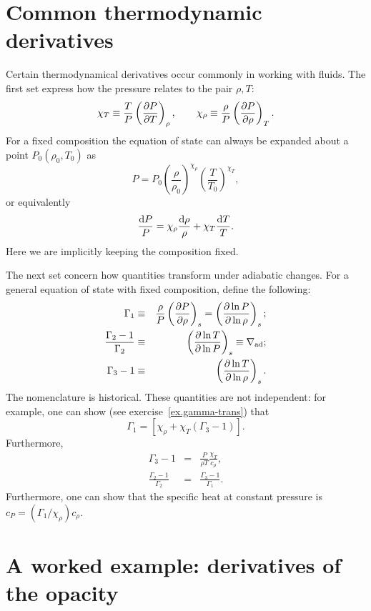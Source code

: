 \section{Common thermodynamic derivatives}

Certain thermodynamical derivatives occur commonly in working with fluids. The first set express how the pressure relates to the pair $\rho,T$:
\begin{equation}
\chi_{T}\equiv\frac{T}{P}\left(\frac{\partial P}{\partial T}\right)_{\rho},\qquad\chi_{\rho}\equiv\frac{\rho}{P}\left(\frac{\partial P}{\partial \rho}\right)_{T}.
\end{equation}
For a fixed composition the equation of state can always be expanded about a point $P_{0}(\rho_{0},T_{0})$ as
\begin{equation}\label{e.eos}
P = P_{0}\left(\frac{\rho}{\rho_{0}}\right)^{\chi_{\rho}}\left(\frac{T}{T_{0}}\right)^{\chi_{T}},
\end{equation}
or equivalently
\[
\frac{\mathrm{d} P}{P} = \chi_{\rho}\frac{\mathrm{d} \rho}{\rho} + \chi_{T}\frac{\mathrm{d} T}{T}.
\]
Here we are implicitly keeping the composition fixed.

The next set concern how quantities transform under adiabatic changes.  For a general equation of state with fixed composition, define the following:
\begin{eqnarray}
\Gamma_{1} &\equiv& \frac{\rho}{P}\left(\frac{\partial P}{\partial \rho}\right)_{s} = \left(\frac{\partial \ln P}{\partial \ln\rho}\right)_{s};\\
\frac{\Gamma_{2}-1}{\Gamma_{2}} &\equiv& \left(\frac{\partial \ln T}{\partial \ln P}\right)_{s} \equiv \nabla_{\mathrm{ad}};\\
\Gamma_{3}-1 &\equiv& \left(\frac{\partial \ln T}{\partial \ln \rho}\right)_{s}.
\end{eqnarray}
The nomenclature is historical. These quantities are not independent: for example, one can show (see exercise~\ref{ex.gamma-trans}) that
\[
\Gamma_{1} = \left[\chi_{\rho} + \chi_{T}\left(\Gamma_{3}-1\right)\right].
\]
Furthermore,
\begin{eqnarray*}
\Gamma_{3}-1 &=& \frac{P}{\rho T}\frac{\chi_{T}}{c_{\rho}},\\
\frac{\Gamma_{2}-1}{\Gamma_{2}} &=& \frac{\Gamma_{3}-1}{\Gamma_{1}}.
\end{eqnarray*}
Furthermore, one can show that the specific heat at constant pressure is $c_{P} = (\Gamma_{1}/\chi_{\rho})c_{\rho}$.

\section{A worked example: derivatives of the opacity}


